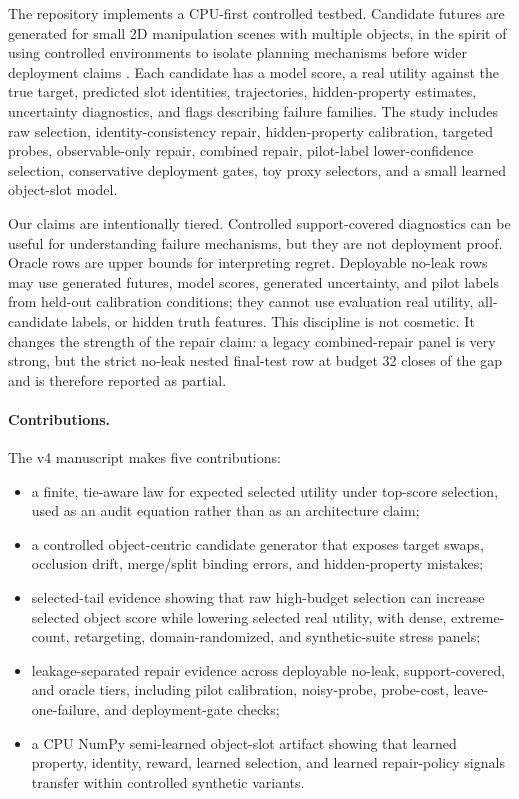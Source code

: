 \documentclass[10pt]{article}
\begin{document}
The repository implements a CPU-first controlled testbed. Candidate futures are generated for small 2D manipulation scenes with multiple objects, in the spirit of using controlled environments to isolate planning mechanisms before wider deployment claims \cite{todorov2012mujoco,brockman2016openai}. Each candidate has a model score, a real utility against the true target, predicted slot identities, trajectories, hidden-property estimates, uncertainty diagnostics, and flags describing failure families. The study includes raw selection, identity-consistency repair, hidden-property calibration, targeted probes, observable-only repair, combined repair, pilot-label lower-confidence selection, conservative deployment gates, toy proxy selectors, and a small learned object-slot model.

Our claims are intentionally tiered. Controlled support-covered diagnostics can be useful for understanding failure mechanisms, but they are not deployment proof. Oracle rows are upper bounds for interpreting regret. Deployable no-leak rows may use generated futures, model scores, generated uncertainty, and pilot labels from held-out calibration conditions; they cannot use evaluation real utility, all-candidate labels, or hidden truth features. This discipline is not cosmetic. It changes the strength of the repair claim: a legacy combined-repair panel is very strong, but the strict no-leak nested final-test row at budget 32 closes \VThreeNoLeakClosure{} of the gap and is therefore reported as partial.

\paragraph{Contributions.}
The v4 manuscript makes five contributions:
\begin{itemize}
  \item a finite, tie-aware law for expected selected utility under top-score selection, used as an audit equation rather than as an architecture claim;
  \item a controlled object-centric candidate generator that exposes target swaps, occlusion drift, merge/split binding errors, and hidden-property mistakes;
  \item selected-tail evidence showing that raw high-budget selection can increase selected object score while lowering selected real utility, with dense, extreme-count, retargeting, domain-randomized, and synthetic-suite stress panels;
  \item leakage-separated repair evidence across deployable no-leak, support-covered, and oracle tiers, including pilot calibration, noisy-probe, probe-cost, leave-one-failure, and deployment-gate checks;
  \item a CPU NumPy semi-learned object-slot artifact showing that learned property, identity, reward, learned selection, and learned repair-policy signals transfer within controlled synthetic variants.
\end{itemize}
\end{document}
